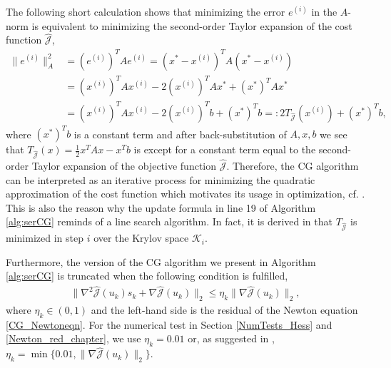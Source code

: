 The following short calculation shows that minimizing the error $e^{(i)}$ in the $A$-norm is equivalent to minimizing the second-order Taylor expansion of the cost function $\hat{\mathcal J}$,
\begin{align*}
\|e^{(i)}\|_A^2 &= (e^{(i)})^T A e^{(i)} = (x^* - x^{(i)})^T A (x^* - x^{(i)})\\
 &= (x^{(i)})^T A x^{(i)} - 2 (x^{(i)})^T A x^* + (x^*)^T A x^* \\
 &= (x^{(i)})^T A x^{(i)} - 2 (x^{(i)})^T b + (x^*)^T b =: 2 T_{\hat{\mathcal{J}}}(x^{(i)}) + (x^*)^T b,
\end{align*}
where $(x^*)^T b$ is a constant term and after back-substitution of $A, x, b$ we see that $T_{\hat{\mathcal{J}}}(x) = \frac{1}{2} x^T A x - x^T b$ is except for a constant term equal to the second-order Taylor expansion of the objective function $\hat{\mathcal J}$. Therefore, the CG algorithm can be interpreted as an iterative process for minimizing the quadratic approximation of the cost function which motivates its usage in optimization, cf. \cite{Tre97}. This is also the reason why the update formula in line 19 of Algorithm \ref{alg:serCG} reminds of a line search algorithm. In fact, it is derived in \cite{Tre97} that $T_{\hat{\mathcal J}}$ is minimized in step $i$ over the Krylov space $\mathcal{K}_i$.

Furthermore, the version of the CG algorithm we present in Algorithm \ref{alg:serCG} is truncated when the following condition is fulfilled,
\begin{align}
 \label{CGcond}
 \|\nabla^2 \hat{\mathcal J}(u_k)s_k + \nabla \hat{\mathcal J}(u_k)\|_2 \leq \eta_k \|\nabla\hat{\mathcal J}(u_k)\|_2,
\end{align}
where $\eta_k \in (0,1)$ and the left-hand side is the residual of the Newton equation \eqref{CG_Newtoneqn}. For the numerical test in Section \ref{NumTests_Hess} and \ref{Newton_red_chapter}, we use $\eta_k = 0.01$ or, as suggested in \cite{H08}, $\eta_k = \min \{0.01, \| \nabla \hat{\mathcal J}(u_k)\|_2 \}$.

